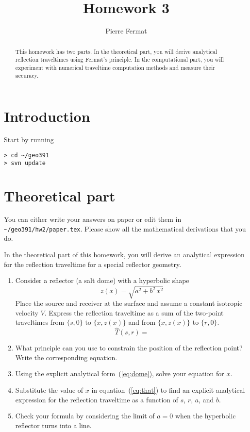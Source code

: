 \author{Pierre Fermat}
\title{Homework 3}

\begin{abstract}
This homework has two parts. In the theoretical part, you will derive
analytical reflection traveltimes using Fermat's principle. In the
computational part, you will experiment with numerical traveltime
computation methods and measure their accuracy.
\end{abstract}


\section{Introduction}

Start by running
\begin{verbatim}
> cd ~/geo391
> svn update
\end{verbatim}

\section{Theoretical part}

You can either write your answers on paper or edit them in
\verb#~/geo391/hw2/paper.tex#. Please show all the mathematical
derivations that you do.

In the theoretical part of this homework, you will derive an
analytical expression for the reflection traveltime for a special
reflector geometry. 

\begin{enumerate}
\item Consider a reflector (a salt dome) with a hyperbolic shape
\begin{equation}
  \label{eq:dome}
  z(x) = \sqrt{a^2 + b^2\,x^2}
\end{equation}
Place the source and receiver at the surface and assume a constant
isotropic velocity $V$. Express the reflection traveltime as a sum of
the two-point traveltimes from $\{s,0\}$ to $\{x,z(x)\}$ and from
$\{x,z(x)\}$ to $\{r,0\}$.
\begin{equation}
  \label{eq:that}
  \widehat{T}(s,r) = 
\end{equation}

\item What principle can you use to constrain the position of the
  reflection point? Write the corresponding equation.

\item Using the explicit analytical form~(\ref{eq:dome}), solve your
  equation for $x$.

\item Substitute the value of $x$ in equation~(\ref{eq:that}) to find
  an explicit analytical expression for the reflection traveltime as a
  function of $s$, $r$, $a$, and $b$.

\item Check your formula by considering the limit of $a=0$ when the
  hyperbolic reflector turns into a line.
\end{enumerate}

